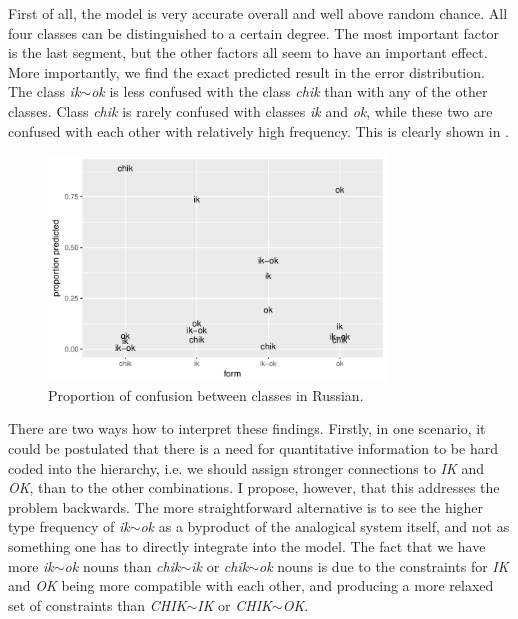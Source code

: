 First of all, the model is very accurate overall and well above random chance. All four classes can be distinguished to a certain degree. The most important factor is the last segment, but the other factors all seem to have an important effect. More importantly, we find the exact predicted result in the error distribution. The class \textit{ik$\sim$ok} is less confused with the class \textit{chik} than with any of the other classes. Class \textit{chik} is rarely confused with classes \textit{ik} and \textit{ok}, while these two are confused with each other with relatively high frequency. This is clearly shown in .

\begin{figure}
  \centering
  \includegraphics[width=0.8\textwidth]{./figures/russian/rus.pdf}
  \caption{Proportion of confusion between classes in Russian.}\label{fig:russian-results}
\end{figure}


There are two ways how to interpret these findings. Firstly, in one scenario, it could be postulated that there is a need for quantitative information to be hard coded into the hierarchy, i.e. we should assign stronger connections to \textit{IK} and \textit{OK}, than to the other combinations. I propose, however, that this addresses the problem backwards. The more straightforward alternative is to see the higher type frequency of \textit{ik$\sim$ok} as a byproduct of the analogical system itself, and not as something one has to directly integrate into the model. The fact that we have more \textit{ik$\sim$ok} nouns than \textit{chik$\sim$ik} or \textit{chik$\sim$ok} nouns is due to the constraints for \textit{IK} and \textit{OK} being more compatible with each other, and producing a more relaxed set of constraints than \textit{CHIK$\sim$IK} or \textit{CHIK$\sim$OK}.

